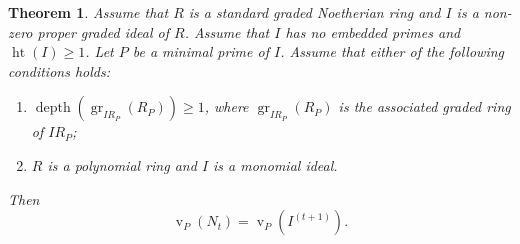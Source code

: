 \documentclass[12pt]{amsart}
\def\v{\operatorname{v}}
\newtheorem{theorem}[lemma]{Theorem}
\begin{document}
\begin{theorem}\label{thm_v_N} 
Assume that $R$ is a standard graded Noetherian ring and $I$ is a non-zero proper graded ideal of $R$. Assume that $I$ has no embedded primes and $\operatorname{ht}(I) \ge 1$. Let $P$ be a minimal prime of $I$. Assume that either of the following conditions holds: 
\begin{enumerate}
    \item $\operatorname{depth}(\operatorname{gr}_{I R_P}(R_P)) \ge 1$, where $\operatorname{gr}_{I R_P}(R_P)$ is the associated graded ring of $I R_P$;
    \item $R$ is a polynomial ring and $I$ is a monomial ideal.
\end{enumerate} 
Then 
$$\v_P(N_t) = \v_P(I^{(t+1)}).$$    
\end{theorem}
\end{document}
